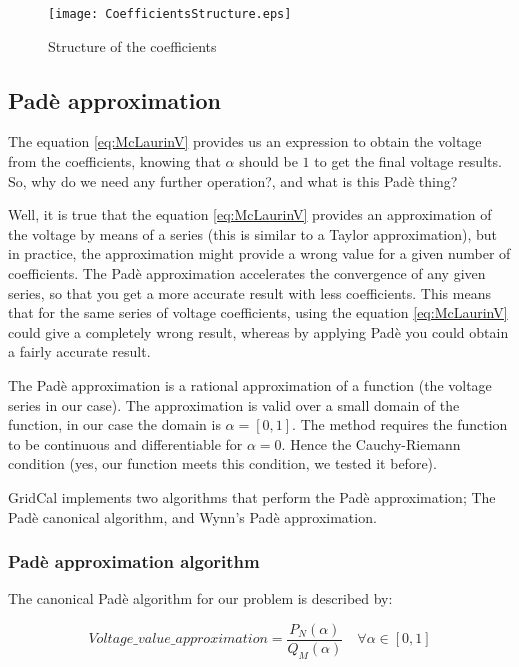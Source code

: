 \documentclass[11pt,fleqn]{book} %
\begin{document}
\begin{figure}[h]
	\centering
	\texttt{[image: CoefficientsStructure.eps]}
	\caption{Structure of the coefficients}
	\label{fig:CoefficientsStructure}
\end{figure}

\subsection{Padè approximation}

The equation \ref{eq:McLaurinV} provides us an expression to obtain the voltage from the coefficients, knowing that $\alpha$ should be $1$ to get the final voltage results. So, why do we need any further operation?, and what is this Padè thing?

Well, it is true that the equation \ref{eq:McLaurinV} provides an approximation of the voltage by means of a series (this is similar to a Taylor approximation), but in practice, the approximation might provide a wrong value for a given number of coefficients. The Padè approximation accelerates the convergence of any given series, so that you get a more accurate result with less coefficients. This means that for the same series of voltage coefficients, using the equation \ref{eq:McLaurinV} could give a completely wrong result, whereas by applying Padè you could obtain a fairly accurate result.

The Padè approximation is a rational approximation of a function (the voltage series in our case). The approximation is valid over a small domain of the function, in our case the domain is $\alpha=[0,1]$. The method requires the function to be continuous and differentiable for $\alpha=0$. Hence the Cauchy-Riemann condition (yes, our function meets this condition, we tested it before).

GridCal implements two algorithms that perform the Padè approximation; The Padè canonical algorithm, and Wynn's Padè approximation.

\subsubsection{Padè approximation algorithm}

The canonical Padè algorithm for our problem is described by:

\begin{equation}
Voltage\_value\_approximation = \frac{P_N(\alpha)}{Q_M(\alpha)} \quad \forall \alpha \in [0,1]
\label{eq:pade_apprx}
\end{equation}
\end{document}
